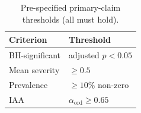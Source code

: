 \begin{table}[htbp]
  \centering\small
  \caption{Pre-specified primary-claim thresholds (all must hold).}
  \label{tab:primary_claim_criteria}
  \begin{tabular}{@{}ll@{}}
    \toprule
    Criterion & Threshold \\
    \midrule
    BH-significant & adjusted $p < 0.05$ \\
    Mean severity & $\ge 0.5$ \\
    Prevalence & $\ge 10\%$ non-zero \\
    IAA & $\alpha_{\mathrm{ord}} \ge 0.65$ \\
    \bottomrule
  \end{tabular}
\end{table}
